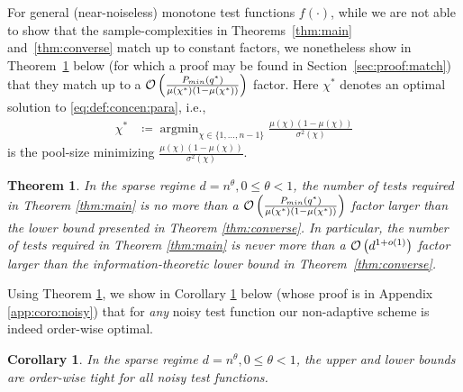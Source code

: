 \documentclass[onecolumn,letterpaper]{IEEEtran}
\DeclareMathOperator*{\argmin}{argmin}
\newtheorem{theorem}{Theorem}
\newtheorem{corollary}{Corollary}
\newcommand{\cO}{{\cal O}}
\newcommand{\cp}{{q}}
\newcommand{\cpn}{{\cp^*}}
\newcommand{\pminn}{{P_{min}(\cpn)}}
\newcommand{\plsize}{{\chi}}
\newcommand{\mean}{{\mu}}
\newcommand{\var}{{\sigma^{2}}}
\begin{document}


For general (near-noiseless) monotone test functions $f(\cdot)$, while we are not able to show that the sample-complexities in Theorems~\ref{thm:main} and~\ref{thm:converse} match up to constant factors, we nonetheless show in Theorem~\ref{thm:match} below (for which a proof may be found in Section~\ref{sec:proof:match}) that they match up to a $\cO\left( \frac{\pminn}{\mean(\plsize^*) \left( 1-\mean(\plsize^*) \right)} \right)$ factor. 
{Here $\plsize^*$ denotes an optimal solution to \eqref{eq:def:concen:para}, i.e., 
\begin{equation} 
\label{eq:def:optimal-size}
\begin{aligned} 
    \plsize^*&\coloneqq\argmin_{\plsize\in \{1,\dots,n-1\}} \frac{\mean(\plsize)(1-\mean(\plsize))}{\var(\plsize)}
\end{aligned}
\end{equation}
is the pool-size minimizing $\frac{\mean(\plsize)\left(1-\mean(\plsize)\right)}{\var(\plsize)}$.} 

\begin{theorem} \label{thm:match}
In the sparse regime $d=n^\theta, 0\leq\theta <1$, the number of tests required in Theorem \ref{thm:main} is no more than a $\cO\left( \frac{\pminn}{\mean(\plsize^*) \left( 1-\mean(\plsize^*) \right)} \right)$ factor larger than the lower bound presented in Theorem \ref{thm:converse}. In particular, the number of tests required in Theorem \ref{thm:main} is never more than a $\cO\left(d^{1+o(1)}\right)$ factor larger than the information-theoretic lower bound in Theorem~\ref{thm:converse}.
\end{theorem}

Using Theorem \ref{thm:match}, we show in Corollary \ref{coro:noisy:function} below (whose proof is in Appendix \ref{app:coro:noisy}) that for {\it any} noisy test function our non-adaptive scheme is indeed order-wise optimal.
\begin{corollary}
\label{coro:noisy:function}
In the sparse regime $d=n^\theta, 0\leq\theta <1$, the upper and lower bounds are order-wise tight for all noisy test functions.
\end{corollary}
\end{document}
